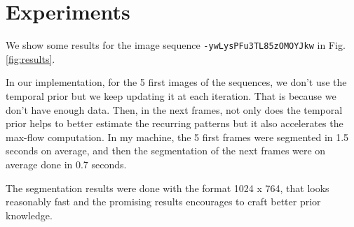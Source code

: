 \documentclass[a4paper,twoside,10pt]{article}
\begin{document}
\section{Experiments}

We show some results for the image sequence \texttt{-ywLysPFu3TL85zOMOYJkw} in Fig. \ref{fig:results}.

In our implementation, for the 5 first images of the sequences, we don't use the temporal prior but we keep updating it at each iteration. That is because we don't have enough data. Then, in the next frames, not only does the temporal prior helps to better estimate the recurring patterns but it also accelerates the max-flow computation.
In my machine, the 5 first frames were segmented in 1.5 seconds on average, and then the segmentation of the next frames were on average done in 0.7 seconds.

The segmentation results were done with the format 1024 x 764, that looks reasonably fast and the promising results encourages to craft better prior knowledge.
\end{document}
